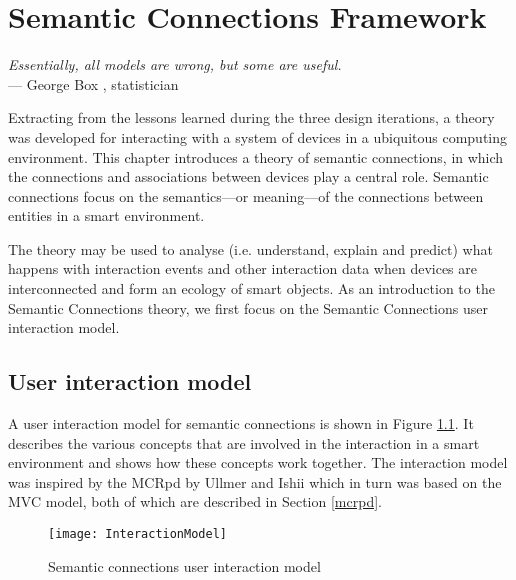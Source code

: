 \chapter{Semantic Connections Framework}
\label{SemanticConnectionsTheory}

\begin{flushright}{\slshape    
Essentially, all models are wrong, but some are useful.} \\ \medskip
    --- George Box \cite{Box1987}, statistician
\end{flushright}




Extracting from the lessons learned during the three design iterations, a theory was developed for interacting with a system of devices in a ubiquitous computing environment. This chapter introduces a theory of semantic connections, in which the connections and associations between devices play a central role. Semantic connections focus on the semantics---or meaning---of the connections between entities in a smart environment. 

The theory may be used to analyse (i.e. understand, explain and predict) what happens with interaction events and other interaction data when devices are interconnected and form an ecology of smart objects. As an introduction to the Semantic Connections theory, we first focus on the Semantic Connections user interaction model.

\section{User interaction model}
\label{InteractionModel}

A user interaction model for semantic connections is shown in Figure \ref{model}. It describes the various concepts that are involved in the interaction in a smart environment and shows how these concepts work together. The interaction model was inspired by the \ac{MCRpd} by Ullmer and Ishii \cite{Ullmer2000} which in turn was based on the \ac{MVC} model, both of which are described in Section \ref{mcrpd}. 

\begin{figure}
\texttt{[image: InteractionModel]}
\caption{Semantic connections user interaction model}
\label{model}
\end{figure}

